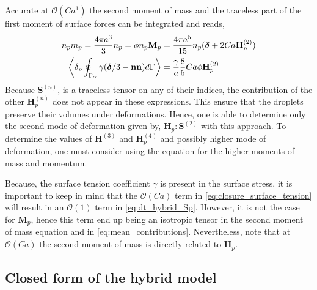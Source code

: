 Accurate at $\mathcal{O}(Ca^1)$ the second moment of mass and the traceless part of the first moment of surface forces can be integrated and reads,  
\begin{align}
    n_p m_p = \frac{4\pi a^3}{3}n_p = \phi 
    \label{eq:second_moment_of_mass}
    n_p \textbf{M}_p &= \frac{4\pi a^5}{15}n_p(\bm\delta+2Ca \textbf{H}_p^{(2)}) \\
    \pSavg{\gamma (\bm\delta/3 - \textbf{nn})} &=\frac{\gamma}{a}\frac{8}{5} Ca \phi \textbf{H}_p^{(2)}
    \label{eq:closure_surface_tension}
\end{align}
Because $\textbf{S}^{(n)}$, is a traceless tensor on any of their indices, the contribution of the other $\textbf{H}_p^{(n)}$ does not appear in these expressions. 
This ensure that the droplets preserve their volumes under deformations. 
Hence, one is able to determine only the second mode of deformation given by, $\textbf{H}_p : \textbf{S}^{(2)}$ with this approach.
To determine the values of $\textbf{H}^{(3)}$ and $\textbf{H}_p^{(4)}$ and possibly higher mode of deformation,  one must consider using the equation for the higher moments of mass and momentum.


Because, the surface tension coefficient $\gamma$ is present in the surface stress, it is important to keep in mind that the $\mathcal{O}(Ca)$ term in \ref{eq:closure_surface_tension} will result in an $\mathcal{O}(1)$ term in \ref{eq:dt_hybrid_Sp}. 
However, it is not the case for $\textbf{M}_p$, hence this term end up being an isotropic tensor in the second moment of mass equation and in \ref{eq:mean_contributions}.  
Nevertheless, note that at $\mathcal{O}(Ca)$ the second moment of mass is directly related to $\textbf{H}_p$. 

\subsection{Closed form of the hybrid model}

